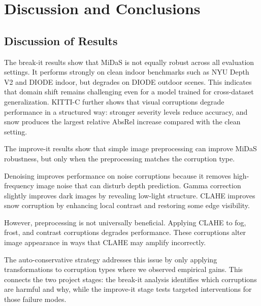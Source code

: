 \documentclass[10pt]{article}
\begin{document}
\section{Discussion and Conclusions}

\subsection{Discussion of Results}

The break-it results show that MiDaS is not equally robust across all evaluation settings. It performs strongly on clean indoor benchmarks such as NYU Depth V2 and DIODE indoor, but degrades on DIODE outdoor scenes. This indicates that domain shift remains challenging even for a model trained for cross-dataset generalization. KITTI-C further shows that visual corruptions degrade performance in a structured way: stronger severity levels reduce accuracy, and snow produces the largest relative AbsRel increase compared with the clean setting.

The improve-it results show that simple image preprocessing can improve MiDaS robustness, but only when the preprocessing matches the corruption type.

Denoising improves performance on noise corruptions because it removes high-frequency image noise that can disturb depth prediction. Gamma correction slightly improves dark images by revealing low-light structure. CLAHE improves snow corruption by enhancing local contrast and restoring some edge visibility.

However, preprocessing is not universally beneficial. Applying CLAHE to fog, frost, and contrast corruptions degrades performance. These corruptions alter image appearance in ways that CLAHE may amplify incorrectly.

The auto-conservative strategy addresses this issue by only applying transformations to corruption types where we observed empirical gains. This connects the two project stages: the break-it analysis identifies which corruptions are harmful and why, while the improve-it stage tests targeted interventions for those failure modes.
\end{document}
